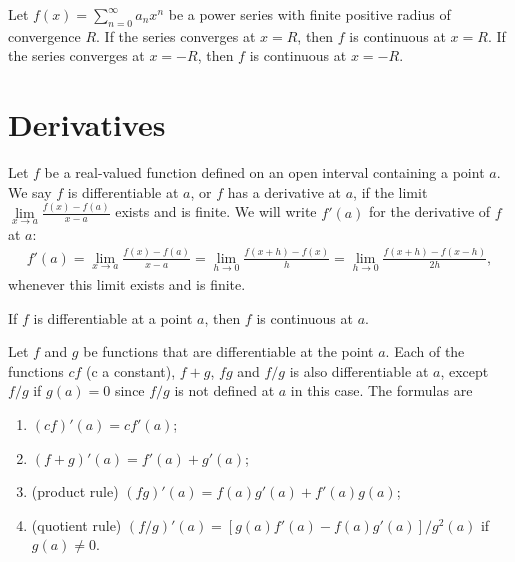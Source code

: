 \begin{theo}{1}
	Let $f(x) = \sum_{n=0}^{\infty} a_n x^n$ be a power series with finite positive radius of convergence $R$. If the series converges at $x = R$, then $f$ is continuous at $x = R$. If the series converges at $x = -R$, then $f$ is continuous	at $x = -R$.
\end{theo}

\newpage

\section{Derivatives}

\begin{defn}{1}
	Let $f$ be a real-valued function defined on an open interval containing a point $a$. We say $f$ is differentiable at $a$, or $f$ has a derivative at $a$, if the limit $\lim\limits_{x\rightarrow a} \frac{f(x)-f(a)}{x-a}$ exists and is finite. We will write $f'(a)$ for the derivative of $f$ at $a$: 
	\begin{align}
		f'(a) = \lim\limits_{x\rightarrow a} \frac{f(x)-f(a)}{x-a} = \lim\limits_{h\rightarrow 0} \frac{f(x+h)-f(x)}{h} = \lim\limits_{h\rightarrow 0} \frac{f(x+h)-f(x-h)}{2h},
	\end{align}
	whenever this limit exists and is finite.
\end{defn}

\begin{theo}{1}
	If $f$ is differentiable at a point $a$, then $f$ is continuous at $a$.
\end{theo}

\begin{theo}{1}
	Let $f$ and $g$ be functions that are differentiable at the point $a$. Each of the functions $cf$ (c a constant), $f +g$, $f g$ and $f /g$ is also differentiable at $a$, except $f /g$ if $g(a) = 0$ since $f /g$ is not defined at $a$ in this case. The formulas are
	\begin{enumerate}
		\item $(cf)'(a) = cf'(a)$;
		\item $(f + g)'(a) = f'(a) + g'(a)$;
		\item (product rule) $(fg)'(a) = f(a)g'(a) + f'(a)g(a)$;
		\item (quotient rule) $(f/g)'(a) = [g(a)f'(a) - f (a)g'(a)]/g^2(a)$ if $g(a) \neq 0$.
	\end{enumerate}
\end{theo}

